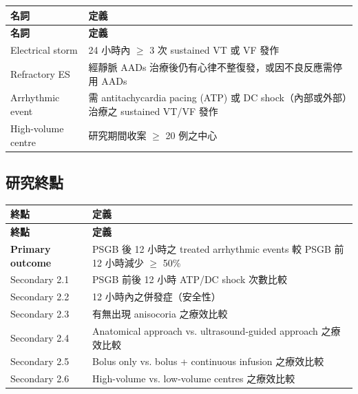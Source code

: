 \documentclass[12pt,a4paper]{article}
\begin{document}
\begin{longtable}{p{4cm}p{10cm}}
\toprule
\textbf{名詞} & \textbf{定義} \\
\midrule
\endfirsthead

\toprule
\textbf{名詞} & \textbf{定義} \\
\midrule
\endhead

\bottomrule
\endfoot

Electrical storm & 24 小時內 $\geq$ 3 次 sustained VT 或 VF 發作 \\
\midrule
Refractory ES & 經靜脈 AADs 治療後仍有心律不整復發，或因不良反應需停用 AADs \\
\midrule
Arrhythmic event & 需 antitachycardia pacing (ATP) 或 DC shock（內部或外部）治療之 sustained VT/VF 發作 \\
\midrule
High-volume centre & 研究期間收案 $\geq$ 20 例之中心 \\
\bottomrule
\end{longtable}

\subsection{研究終點}

\begin{longtable}{p{3.5cm}p{10.5cm}}
\toprule
\textbf{終點} & \textbf{定義} \\
\midrule
\endfirsthead

\toprule
\textbf{終點} & \textbf{定義} \\
\midrule
\endhead

\bottomrule
\endfoot

\textbf{Primary outcome} & PSGB 後 12 小時之 treated arrhythmic events 較 PSGB 前 12 小時減少 $\geq$ 50\% \\
\midrule
Secondary 2.1 & PSGB 前後 12 小時 ATP/DC shock 次數比較 \\
\midrule
Secondary 2.2 & 12 小時內之併發症（安全性） \\
\midrule
Secondary 2.3 & 有無出現 anisocoria 之療效比較 \\
\midrule
Secondary 2.4 & Anatomical approach vs. ultrasound-guided approach 之療效比較 \\
\midrule
Secondary 2.5 & Bolus only vs. bolus + continuous infusion 之療效比較 \\
\midrule
Secondary 2.6 & High-volume vs. low-volume centres 之療效比較 \\
\bottomrule
\end{longtable}
\end{document}
